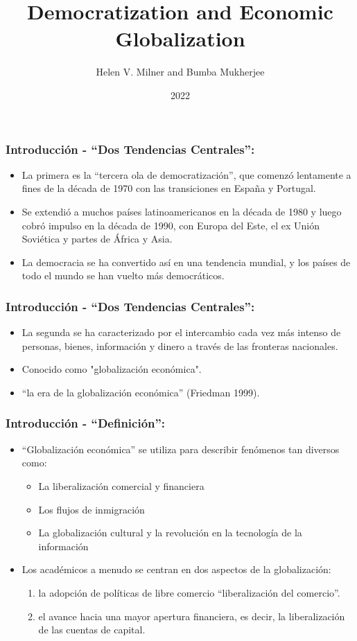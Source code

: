 \documentclass{beamer}
\title{Democratization and Economic Globalization}
\author{Helen V. Milner and Bumba Mukherjee}
\institute{Udelar}
\date{2022}
\begin{document}
\frame{\titlepage}
\begin{frame}
\frametitle{Introducción - “Dos Tendencias Centrales”:}
\begin{itemize}

\item La primera es la “tercera ola de democratización”, que comenzó lentamente a fines de la década de 1970 con las transiciones en España y Portugal.
\item Se extendió a muchos países latinoamericanos en la década de 1980 y luego cobró impulso en la década de 1990, con Europa del Este, el ex Unión Soviética y partes de África y Asia. 
\item La democracia se ha convertido así en una tendencia mundial, y los países de todo el mundo se han vuelto más democráticos.
\end{itemize}

\end{frame}


\begin{frame}
\frametitle{Introducción - “Dos Tendencias Centrales”:}
\begin{itemize}
\item La segunda se ha caracterizado por el intercambio cada vez más intenso de personas, bienes, información y dinero a través de las fronteras nacionales.
\item Conocido  como "globalización económica".
\item“la era de la globalización económica” (Friedman 1999).
\end{itemize}

\end{frame}


\begin{frame}
\frametitle{Introducción - “Definición”:}
\begin{itemize}
\item “Globalización económica” se utiliza para describir fenómenos tan diversos como:
    \begin{itemize} 
    \item La liberalización comercial y financiera
    \item Los flujos de inmigración
    \item La globalización cultural y la revolución en la tecnología de la información
    \end{itemize}
\item Los académicos a menudo se centran en dos aspectos de la globalización: 
\begin{enumerate}
    \item la adopción de políticas de libre comercio “liberalización del comercio”.
    \item el avance hacia una mayor apertura financiera, es decir, la liberalización de las cuentas de capital.

\end{enumerate}
\end{itemize}

\end{frame}
\end{document}
